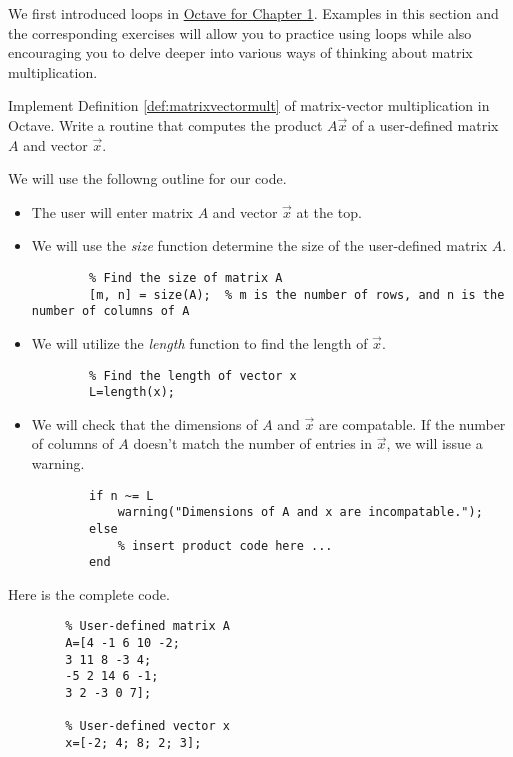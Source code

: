 \documentclass{ximera}
\begin{document}
    We first introduced loops in \href{https://ximera.osu.edu/linearalgebradzv3/xOctave/OCT_vectors/main}{Octave for Chapter 1}.  Examples in this section and the corresponding exercises will allow you to practice using loops while also encouraging you to delve deeper into various ways of thinking about matrix multiplication. 

    \begin{example}\label{ex:oct_mat_prod_def}
        Implement Definition \ref{def:matrixvectormult} of matrix-vector multiplication in Octave.  Write a routine that computes the product $A\vec{x}$ of a user-defined matrix $A$ and vector $\vec{x}$.

    \begin{explanation}
    We will use the followng outline for our code.
    \begin{itemize}
    \item The user will enter matrix $A$ and vector $\vec{x}$ at the top.    
    \item We will use the \emph{size} function determine the size of the user-defined matrix $A$.  
    \begin{verbatim}
        % Find the size of matrix A
        [m, n] = size(A);  % m is the number of rows, and n is the number of columns of A
    \end{verbatim}
    \item We will utilize the \emph{length} function to find the length of $\vec{x}$.
    \begin{verbatim}
        % Find the length of vector x
        L=length(x);
    \end{verbatim}
    \item We will check that the dimensions of $A$ and $\vec{x}$ are compatable.  If the number of columns of $A$ doesn't match the number of entries in $\vec{x}$, we will issue a warning. 
    \begin{verbatim}
        if n ~= L  
            warning("Dimensions of A and x are incompatable.");  
        else  
            % insert product code here ... 
        end    
    \end{verbatim}
\end{itemize}

    Here is the complete code.

    \begin{verbatim}
        % User-defined matrix A
        A=[4 -1 6 10 -2;
        3 11 8 -3 4;
        -5 2 14 6 -1;
        3 2 -3 0 7];

        % User-defined vector x
        x=[-2; 4; 8; 2; 3];


\end{verbatim}
\end{explanation}
\end{example}
\end{document}
